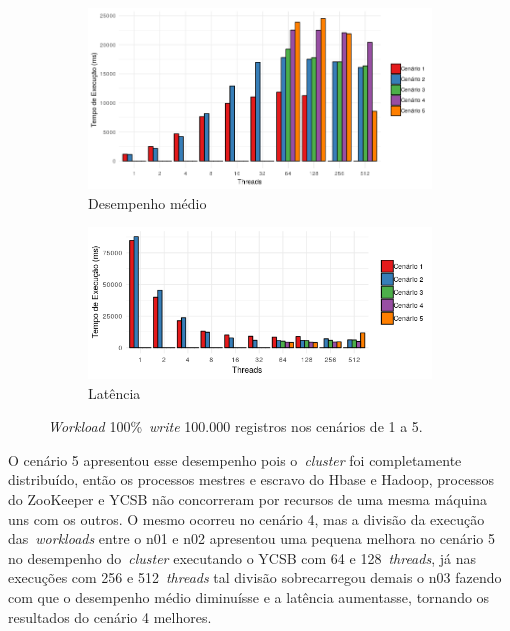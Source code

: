 \documentclass[12pt]{article}
\begin{document}
\begin{figure}
    \centering
    \begin{subfigure}[b]{0.49\textwidth}
        \centering
        \includegraphics[width=\textwidth]{images/figura11}
        \caption{Desempenho médio}
        \label{figura11}
    \end{subfigure}
        \hfill
    \begin{subfigure}[b]{0.49\textwidth}  
        \centering 
        \includegraphics[width=\textwidth]{images/figura12}
        \caption{Latência}%
        \label{figura12}
    \end{subfigure}
    \caption{\emph{Workload} 100\%~\emph{write} 100.000 registros nos cenários de 1 a 5.}
\end{figure}

O cenário 5 apresentou esse desempenho pois o~\emph{cluster} foi completamente distribuído, então os processos mestres e escravo do Hbase e Hadoop, processos do ZooKeeper e YCSB não concorreram por recursos de uma mesma máquina uns com os outros. O mesmo ocorreu no cenário 4, mas a divisão da execução das~\emph{workloads} entre o n01 e n02 apresentou uma pequena melhora no cenário 5 no desempenho do~\emph{cluster} executando o YCSB com 64 e 128~\emph{threads}, já nas execuções com 256 e 512~\emph{threads} tal divisão sobrecarregou demais o n03 fazendo com que o desempenho médio diminuísse e a latência aumentasse, tornando os resultados do cenário 4 melhores.
\end{document}
